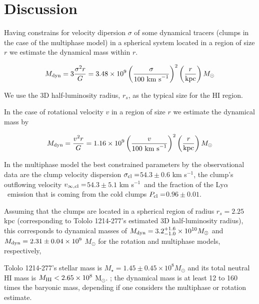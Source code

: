 \documentclass[a4,useAMS,usenatbib,usegraphicx]{mn2e}
\newcommand{\tol}{Tololo 1214-277}
\newcommand{\lya}{Ly$\alpha$}
\newcommand{\sigmaclump}{$54.3\pm 0.6$ km s$^{-1}$}
\newcommand{\inftyclump}{$54.3\pm 5.1$ km s$^{-1}$}
\newcommand{\probaclump}{$0.96\pm 0.01$}
\begin{document}
\section{Discussion}

Having constrains for  velocity dipersion $\sigma$ of some dynamical
tracers (clumps in the case of the multiphase model) in a spherical
system located in a region of size $r$ we estimate the dynamical mass
within $r$. 


\begin{equation}
M_{\rm dyn} = 3 \frac{\sigma ^{2}r}{G} = 3.48\times10^{9}
\left(\frac{\sigma}{100\ \mathrm{km\ s}^{-1}}\right)^2\left(\frac{r}{\mathrm{kpc}}\right) M_{\odot}
\end{equation}

We use the 3D half-luminosity
radius, $r_{s}$, as the typical size for the HI region. 

In the case of rotational velocity $v$ in a region of size $r$ we
estimate the dynamical mass by 

\begin{equation}
M_{\rm dyn} = \frac{v ^{2}r}{G} = 1.16\times10^{9}
\left(\frac{v}{100\ \mathrm{km\ s}^{-1}}\right)^2\left(\frac{r}{\mathrm{kpc}}\right)M_{\odot} 
\end{equation}


In the multiphase model the best constrained parameters by the
observational data are the clump velocity dispersion
$\sigma_{\rm{cl}}=$\sigmaclump ,  the clump's outflowing velocity
$v_{\infty, \rm{cl}}=$\inftyclump\ and the fraction of the
\lya\ emission that is  coming from the cold clumps  $P_{\rm cl}=$\probaclump.


Assuming that the clumps are located in a spherical region of radius
$r_s=2.25$ kpc (corresponding to \tol's estimated 3D half-luminosity
radius), 
this corresponds to dynamical masses of $M_{\rm dyn} =
3.2_{-1.0}^{+1.6}\times 10^{10} M_{\odot}$ and $M_{\rm
  dyn}=2.31\pm0.04 \times 10^{9}$ $M_{\odot}$ for the
rotation and multiphase models, respectively, 

\tol's stellar mass is  $M_{\star} = 1.45\pm0.45\times 10^{8}
M_{\odot}$   \citep{2014PASP..126.1079M} and its total neutral HI mass is $M_{\rm HI}<2.65\times 10^{8}$ M$_{\odot}$. 
\citep{pustilnikmartin07}; the dynamical mass is at least 12 to 160 times
the baryonic mass, depending if one considers the multiphase or
rotation estimate. 
\end{document}
